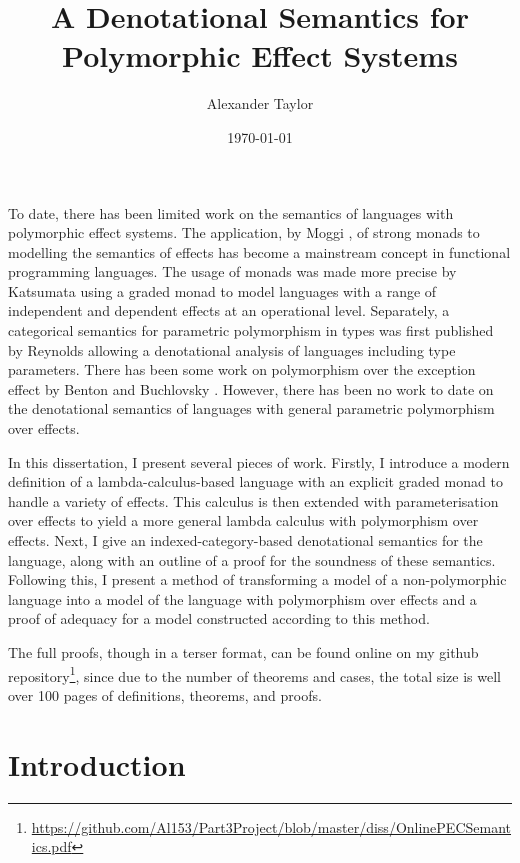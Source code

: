 \documentclass{Report}
\title{A Denotational Semantics for Polymorphic Effect Systems}
\date{\today}
\author{Alexander Taylor}
\begin{document}
\maketitle

\newcommand{\note}[1]{
}

\abstract
To date, there has been limited work on the semantics of languages with polymorphic effect systems. The application, by Moggi \cite{MoggiMonads}, of strong monads to modelling the semantics of effects has become a mainstream concept in functional programming languages. The usage of monads was made more precise by Katsumata \cite{Katsumata:2014} using a graded monad to model languages with a range of independent and dependent effects at an operational level. Separately, a categorical semantics for parametric polymorphism in types was first published by Reynolds \cite{PLCSemantics} allowing a denotational analysis of languages including type parameters. There has been some work on polymorphism over the exception effect by Benton and Buchlovsky \cite{PolymorphicExceptions}. However, there has been no work to date on the denotational semantics of languages with general parametric polymorphism over effects.

In this dissertation, I present several pieces of work. Firstly, I introduce a modern definition of a lambda-calculus-based language with an explicit graded monad to handle a variety of effects. This calculus is then extended with parameterisation over effects to yield a more general lambda calculus with polymorphism over effects. Next, I give an indexed-category-based denotational semantics for the language, along with an outline of a proof for the soundness of these semantics. Following this, I present a method of transforming a model of a non-polymorphic language into a model of the language with polymorphism over effects and a proof of adequacy for a model constructed according to this method.

The full proofs, though in a terser format, can be found online on my github repository\footnote{\url{https://github.com/Al153/Part3Project/blob/master/diss/OnlinePECSemantics.pdf}}, since due to the number of theorems and cases, the total size is well over 100 pages of definitions, theorems, and proofs.

\tableofcontents

\chapter{Introduction}
\end{document}
